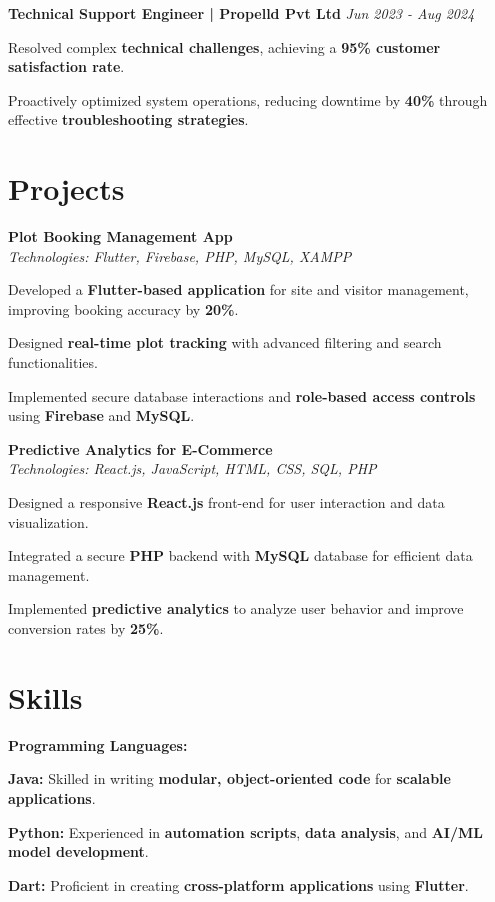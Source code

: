 \documentclass[a4paper,11pt]{article}
\begin{document}
\textbf{Technical Support Engineer | Propelld Pvt Ltd} \hfill \textit{Jun 2023 - Aug 2024} \\
\begin{compactitem}
    \item Resolved complex \textbf{technical challenges}, achieving a \textbf{95\% customer satisfaction rate}.
    \item Proactively optimized system operations, reducing downtime by \textbf{40\%} through effective \textbf{troubleshooting strategies}.
\end{compactitem}

\section*{Projects}

\textbf{Plot Booking Management App} \\
\textit{Technologies: Flutter, Firebase, PHP, MySQL, XAMPP} \\
\begin{compactitem}
    \item Developed a \textbf{Flutter-based application} for site and visitor management, improving booking accuracy by \textbf{20\%}.
    \item Designed \textbf{real-time plot tracking} with advanced filtering and search functionalities.
    \item Implemented secure database interactions and \textbf{role-based access controls} using \textbf{Firebase} and \textbf{MySQL}.
\end{compactitem}

\textbf{Predictive Analytics for E-Commerce} \\
\textit{Technologies: React.js, JavaScript, HTML, CSS, SQL, PHP} \\
\begin{compactitem}
    \item Designed a responsive \textbf{React.js} front-end for user interaction and data visualization.
    \item Integrated a secure \textbf{PHP} backend with \textbf{MySQL} database for efficient data management.
    \item Implemented \textbf{predictive analytics} to analyze user behavior and improve conversion rates by \textbf{25\%}.
\end{compactitem}

\section*{Skills}
\textbf{Programming Languages:} 
\begin{compactitem}
    \item \textbf{Java:} Skilled in writing \textbf{modular, object-oriented code} for \textbf{scalable applications}.
    \item \textbf{Python:} Experienced in \textbf{automation scripts}, \textbf{data analysis}, and \textbf{AI/ML model development}.
    \item \textbf{Dart:} Proficient in creating \textbf{cross-platform applications} using \textbf{Flutter}.
\end{compactitem}
\end{document}
